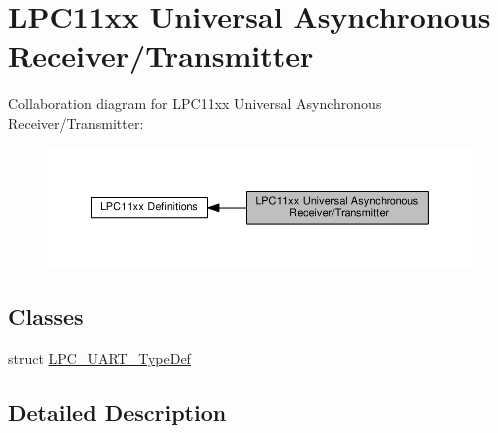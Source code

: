 \hypertarget{group___l_p_c11xx___u_a_r_t}{}\section{L\+P\+C11xx Universal Asynchronous Receiver/\+Transmitter}
\label{group___l_p_c11xx___u_a_r_t}
Collaboration diagram for L\+P\+C11xx Universal Asynchronous Receiver/\+Transmitter\+:\nopagebreak
\begin{figure}[H]
\begin{center}
\leavevmode
\includegraphics[width=350pt]{group___l_p_c11xx___u_a_r_t}
\end{center}
\end{figure}
\subsection*{Classes}
\begin{DoxyCompactItemize}
\item 
struct \hyperlink{struct_l_p_c___u_a_r_t___type_def}{L\+P\+C\+\_\+\+U\+A\+R\+T\+\_\+\+Type\+Def}
\end{DoxyCompactItemize}


\subsection{Detailed Description}
